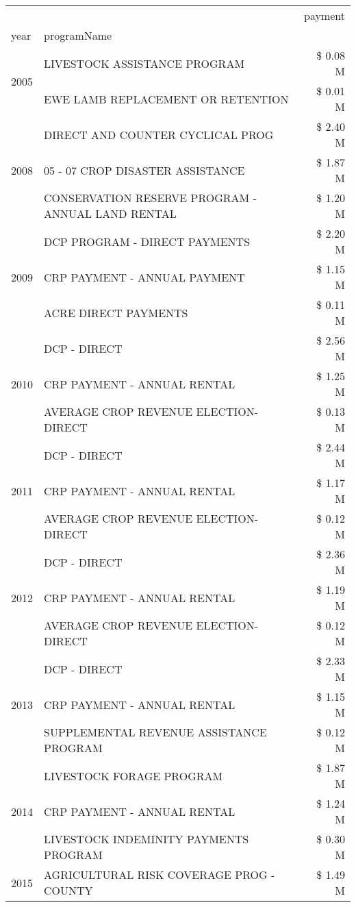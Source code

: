 \begin{tabular}{llr}
\toprule
 &  & payment \\
year & programName &  \\
\midrule
\multirow[t]{2}{*}{2005} & LIVESTOCK ASSISTANCE PROGRAM & \$ 0.08 M \\
 & EWE LAMB REPLACEMENT OR RETENTION & \$ 0.01 M \\
\cline{1-3}
\multirow[t]{3}{*}{2008} & DIRECT AND COUNTER CYCLICAL PROG & \$ 2.40 M \\
 & 05 - 07 CROP DISASTER ASSISTANCE & \$ 1.87 M \\
 & CONSERVATION RESERVE PROGRAM - ANNUAL LAND RENTAL & \$ 1.20 M \\
\cline{1-3}
\multirow[t]{3}{*}{2009} & DCP PROGRAM - DIRECT PAYMENTS & \$ 2.20 M \\
 & CRP PAYMENT - ANNUAL PAYMENT & \$ 1.15 M \\
 & ACRE DIRECT PAYMENTS & \$ 0.11 M \\
\cline{1-3}
\multirow[t]{3}{*}{2010} & DCP - DIRECT & \$ 2.56 M \\
 & CRP PAYMENT - ANNUAL RENTAL & \$ 1.25 M \\
 & AVERAGE CROP REVENUE ELECTION-DIRECT & \$ 0.13 M \\
\cline{1-3}
\multirow[t]{3}{*}{2011} & DCP - DIRECT & \$ 2.44 M \\
 & CRP PAYMENT - ANNUAL RENTAL & \$ 1.17 M \\
 & AVERAGE CROP REVENUE ELECTION-DIRECT & \$ 0.12 M \\
\cline{1-3}
\multirow[t]{3}{*}{2012} & DCP - DIRECT & \$ 2.36 M \\
 & CRP PAYMENT - ANNUAL RENTAL & \$ 1.19 M \\
 & AVERAGE CROP REVENUE ELECTION-DIRECT & \$ 0.12 M \\
\cline{1-3}
\multirow[t]{3}{*}{2013} & DCP - DIRECT & \$ 2.33 M \\
 & CRP PAYMENT - ANNUAL RENTAL & \$ 1.15 M \\
 & SUPPLEMENTAL REVENUE ASSISTANCE PROGRAM & \$ 0.12 M \\
\cline{1-3}
\multirow[t]{3}{*}{2014} & LIVESTOCK FORAGE PROGRAM & \$ 1.87 M \\
 & CRP PAYMENT - ANNUAL RENTAL & \$ 1.24 M \\
 & LIVESTOCK INDEMINITY PAYMENTS PROGRAM & \$ 0.30 M \\
\cline{1-3}
\multirow[t]{3}{*}{2015} & AGRICULTURAL RISK COVERAGE PROG - COUNTY & \$ 1.49 M \\

\end{tabular}
